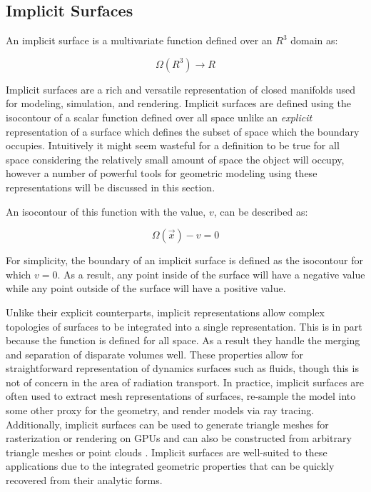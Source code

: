 \subsection{Implicit Surfaces}\label{subsec:implicit_surfaces}

An implicit surface is a multivariate function defined over an $ R^3 $ domain as:

\begin{equation}
    \Omega(R^3)\rightarrow R
\end{equation}

Implicit surfaces are a rich and versatile representation of closed manifolds
used for modeling, simulation, and rendering. Implicit surfaces are defined
using the isocontour of a scalar function defined over all space unlike an
\textit{explicit} representation of a surface which defines the subset of space
which the boundary occupies. Intuitively it might seem wasteful for a definition
to be true for all space considering the relatively small amount of space the
object will occupy, however a number of powerful tools for geometric modeling
using these representations will be discussed in this section.

An isocontour of this function with the value, $v$, can be described as:

\begin{equation}
  \Omega(\vec{x}) - v  = 0 
\end{equation}

For simplicity, the boundary of an implicit surface is defined as the isocontour
for which $v=0$. As a result, any point inside of the surface will have a negative value
while any point outside of the surface will have a positive value.

Unlike their explicit counterparts, implicit representations allow complex
topologies of surfaces to be integrated into a single representation. This is in
part because the function is defined for all space. As a result they handle the
merging and separation of disparate volumes well. These properties allow for
straightforward representation of dynamics surfaces such as fluids, though this
is not of concern in the area of radiation transport. In practice, implicit
surfaces are often used to extract mesh representations of surfaces, re-sample
the model into some other proxy for the geometry, and render models via ray
tracing. Additionally, implicit surfaces can be used to generate triangle meshes
for rasterization or rendering on GPUs \cite{Sethian_1996} and can also be
constructed from arbitrary triangle meshes or point clouds
\cite{Sigg_2006}. Implicit surfaces are well-suited to these applications due to
the integrated geometric properties that can be quickly recovered from their
analytic forms.

